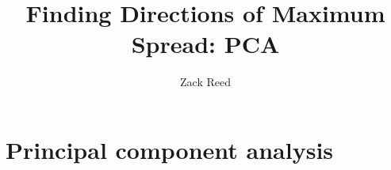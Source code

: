 \documentclass{ximera}
\author{Zack Reed}
\title{Finding Directions of Maximum Spread: PCA}
\begin{document}
\begin{abstract}

\end{abstract}
\maketitle


\section{Principal component analysis}

\end{document}
